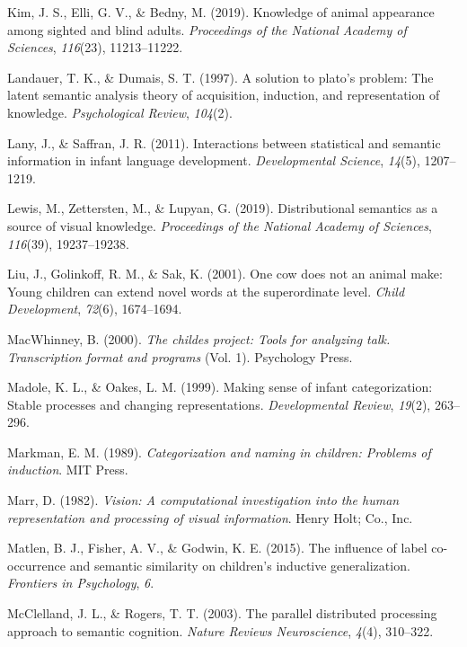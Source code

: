 \documentclass[english,,man,floatsintext]{apa6}
\begin{document}
\leavevmode\hypertarget{ref-kim2019}{}%
Kim, J. S., Elli, G. V., \& Bedny, M. (2019). Knowledge of animal appearance among sighted and blind adults. \emph{Proceedings of the National Academy of Sciences}, \emph{116}(23), 11213--11222.

\leavevmode\hypertarget{ref-landauer1997}{}%
Landauer, T. K., \& Dumais, S. T. (1997). A solution to plato's problem: The latent semantic analysis theory of acquisition, induction, and representation of knowledge. \emph{Psychological Review}, \emph{104}(2).

\leavevmode\hypertarget{ref-lany2011}{}%
Lany, J., \& Saffran, J. R. (2011). Interactions between statistical and semantic information in infant language development. \emph{Developmental Science}, \emph{14}(5), 1207--1219.

\leavevmode\hypertarget{ref-lewis2019}{}%
Lewis, M., Zettersten, M., \& Lupyan, G. (2019). Distributional semantics as a source of visual knowledge. \emph{Proceedings of the National Academy of Sciences}, \emph{116}(39), 19237--19238.

\leavevmode\hypertarget{ref-liu2001}{}%
Liu, J., Golinkoff, R. M., \& Sak, K. (2001). One cow does not an animal make: Young children can extend novel words at the superordinate level. \emph{Child Development}, \emph{72}(6), 1674--1694.

\leavevmode\hypertarget{ref-macwhinney2000}{}%
MacWhinney, B. (2000). \emph{The childes project: Tools for analyzing talk. Transcription format and programs} (Vol. 1). Psychology Press.

\leavevmode\hypertarget{ref-madole1999}{}%
Madole, K. L., \& Oakes, L. M. (1999). Making sense of infant categorization: Stable processes and changing representations. \emph{Developmental Review}, \emph{19}(2), 263--296.

\leavevmode\hypertarget{ref-markman1989}{}%
Markman, E. M. (1989). \emph{Categorization and naming in children: Problems of induction}. MIT Press.

\leavevmode\hypertarget{ref-marr1982}{}%
Marr, D. (1982). \emph{Vision: A computational investigation into the human representation and processing of visual information}. Henry Holt; Co., Inc.

\leavevmode\hypertarget{ref-matlen2015}{}%
Matlen, B. J., Fisher, A. V., \& Godwin, K. E. (2015). The influence of label co-occurrence and semantic similarity on children's inductive generalization. \emph{Frontiers in Psychology}, \emph{6}.

\leavevmode\hypertarget{ref-mcclelland2003}{}%
McClelland, J. L., \& Rogers, T. T. (2003). The parallel distributed processing approach to semantic cognition. \emph{Nature Reviews Neuroscience}, \emph{4}(4), 310--322.
\end{document}
